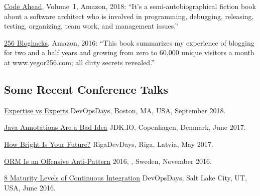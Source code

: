 \documentclass{vl}
\begin{document}
    \href{https://amzn.to/2u9BbqF}{Code Ahead}, Volume~1, Amazon, 2018:
    ``It's a semi-autobiographical fiction book about a software architect
    who is involved in programming, debugging, releasing, testing,
    organizing, team work, and management issues.''

    \href{https://amzn.to/2GkuyXf}{256 Bloghacks}, Amazon, 2016:
    ``This book summarizes my experience of blogging for two and a half years and growing from zero to 60,000
    unique visitors a month at www.yegor256.com; all dirty secrets revealed.''

    \subsection*{Some Recent Conference Talks}

    \begin{samepage}
        \href{https://youtu.be/KCx1o_lSMkI}{Expertise vs Experts}\newline
        DevOpsDays, Boston, MA, USA, September 2018.
    \end{samepage}

    \begin{samepage}
        \href{https://youtu.be/cv23Z6xpwDw}{Java Annotations Are a Bad Idea}\newline
        JDK.IO, Copenhagen, Denmark, June 2017.
    \end{samepage}

    \begin{samepage}
        \href{https://www.youtube.com/watch?v=IGbteQpTNCA}{How Bright Is Your Future?}\newline
        RigaDevDays, Riga, Latvia, May 2017.
    \end{samepage}

    \begin{samepage}
        \href{https://www.youtube.com/watch?v=03PXmPc7Q3g}{ORM Is an Offensive Anti-Pattern}\newline
         2016, , Sweden, November 2016.
    \end{samepage}

    \begin{samepage}
        \href{https://www.youtube.com/watch?v=3dJP_LtUGgg}{8 Maturity Levels of Continuous Integration}\newline
        DevOpsDays, Salt Lake City, UT, USA, June 2016.
    \end{samepage}
\end{document}
